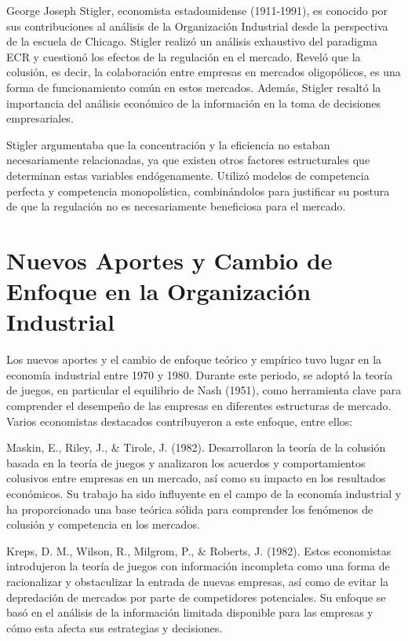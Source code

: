 \documentclass[
  doc,
  floatsintext,
  longtable,
  a4paper,
  nolmodern,
  notxfonts,
  notimes,
  12pt,
  colorlinks=true,linkcolor=blue,citecolor=blue,urlcolor=blue]{apa7}
\begin{document}
George Joseph Stigler, economista estadounidense (1911-1991), es
conocido por sus contribuciones al análisis de la Organización
Industrial desde la perspectiva de la escuela de Chicago. Stigler
realizó un análisis exhaustivo del paradigma ECR y cuestionó los efectos
de la regulación en el mercado. Reveló que la colusión, es decir, la
colaboración entre empresas en mercados oligopólicos, es una forma de
funcionamiento común en estos mercados. Además, Stigler resaltó la
importancia del análisis económico de la información en la toma de
decisiones empresariales.

Stigler argumentaba que la concentración y la eficiencia no estaban
necesariamente relacionadas, ya que existen otros factores estructurales
que determinan estas variables endógenamente. Utilizó modelos de
competencia perfecta y competencia monopolística, combinándolos para
justificar su postura de que la regulación no es necesariamente
beneficiosa para el mercado.

\section{Nuevos Aportes y Cambio de Enfoque en la Organización
Industrial}\label{nuevos-aportes-y-cambio-de-enfoque-en-la-organizaciuxf3n-industrial}

Los nuevos aportes y el cambio de enfoque teórico y empírico tuvo lugar
en la economía industrial entre 1970 y 1980. Durante este periodo, se
adoptó la teoría de juegos, en particular el equilibrio de Nash (1951),
como herramienta clave para comprender el desempeño de las empresas en
diferentes estructuras de mercado. Varios economistas destacados
contribuyeron a este enfoque, entre ellos:

Maskin, E., Riley, J., \& Tirole, J. (1982). Desarrollaron la teoría de
la colusión basada en la teoría de juegos y analizaron los acuerdos y
comportamientos colusivos entre empresas en un mercado, así como su
impacto en los resultados económicos. Su trabajo ha sido influyente en
el campo de la economía industrial y ha proporcionado una base teórica
sólida para comprender los fenómenos de colusión y competencia en los
mercados.

Kreps, D. M., Wilson, R., Milgrom, P., \& Roberts, J. (1982). Estos
economistas introdujeron la teoría de juegos con información incompleta
como una forma de racionalizar y obstaculizar la entrada de nuevas
empresas, así como de evitar la depredación de mercados por parte de
competidores potenciales. Su enfoque se basó en el análisis de la
información limitada disponible para las empresas y cómo esta afecta sus
estrategias y decisiones.
\end{document}
